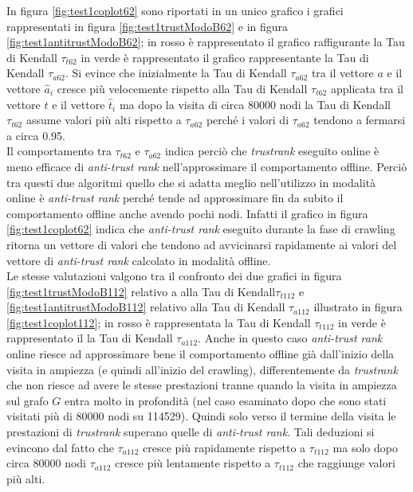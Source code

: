 In figura \ref{fig:test1coplot62} sono riportati in un unico grafico i grafici rappresentati in figura \ref{fig:test1trustModoB62}  e in figura \ref{fig:test1antitrustModoB62}; in rosso è rappresentato il grafico raffigurante la Tau di Kendall \(\tau_{t62}\) in verde è rappresentato il grafico  rappresentante la Tau di Kendall \(\tau_{a62}\). Si evince che inizialmente la Tau di Kendall \(\tau_{a62}\) tra il vettore \(a\) e il vettore \(\hat{a}_i\) cresce più velocemente rispetto alla Tau di Kendall \(\tau_{t62}\) applicata  tra il vettore \(t\) e il vettore \(\hat{t}_i\) ma dopo la visita di circa 80000 nodi la Tau di Kendall \(\tau_{t62}\) assume valori più alti rispetto a \(\tau_{a62}\) perché i valori di \(\tau_{a62}\) tendono a fermarsi a circa 0.95.\\
Il comportamento tra \(\tau_{t62}\) e \(\tau_{a62}\) indica perciò che \textit{trustrank} eseguito online è meno efficace di \textit{anti-trust rank} nell'approssimare il comportamento offline. Perciò tra questi due algoritmi quello che si adatta meglio nell'utilizzo in modalità online è \textit{anti-trust rank} perché tende ad approssimare fin da subito il comportamento offline anche avendo pochi nodi. Infatti il grafico in figura \ref{fig:test1coplot62} indica che \textit{anti-trust rank} eseguito durante la fase di crawling ritorna un vettore di valori che tendono ad avvicinarsi rapidamente ai valori del vettore di \textit{anti-trust rank} calcolato in modalità offline.\\
Le stesse valutazioni valgono tra il confronto dei due grafici in figura \ref{fig:test1trustModoB112} relativo a alla Tau di Kendall\(\tau_{t112}\) e \ref{fig:test1antitrustModoB112}  relativo alla Tau di Kendall \(\tau_{a112}\) illustrato in figura \ref{fig:test1coplot112}; in rosso è rappresentata la Tau di Kendall \(\tau_{t112}\) in verde è rappresentato il la Tau di Kendall \(\tau_{a112}\). Anche in questo caso \textit{anti-trust rank} online riesce ad approssimare bene  il comportamento offline già dall'inizio della visita in ampiezza (e quindi all'inizio del crawling), differentemente da \textit{trustrank} che non riesce ad avere le stesse prestazioni tranne quando la visita in ampiezza sul grafo \(G\) entra molto in profondità (nel caso esaminato dopo che sono stati visitati più di 80000 nodi su 114529). Quindi solo verso il termine della visita le prestazioni di \textit{trustrank} superano quelle di \textit{anti-trust rank}. Tali deduzioni si evincono dal fatto che \(\tau_{a112}\) cresce più 
rapidamente rispetto a \(\tau_{t112}\) ma solo dopo circa 80000 nodi \(\tau_{a112}\) cresce più lentamente rispetto a \(\tau_{
t112}\) che raggiunge valori più alti.



